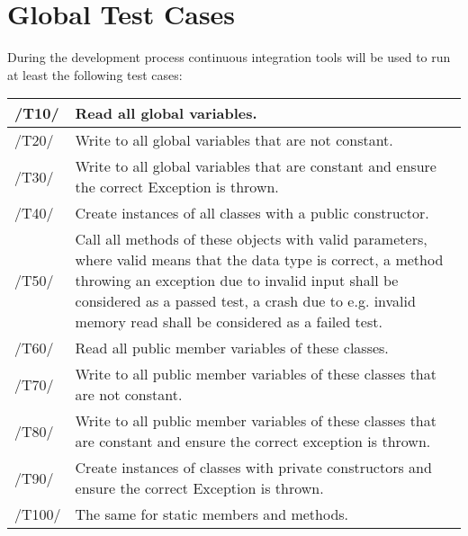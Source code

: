 \chapter{Global Test Cases}
During the development process continuous integration tools will be used to run at least the following test cases: \\

\begin{longtable}{|p{1cm} | p{15cm}|}
  \hline
  /T10/ & Read all global variables.\\
  \hline
  /T20/ & Write to all global variables that are not constant.\\
  \hline
  /T30/ & Write to all global variables that are constant and ensure the correct Exception is thrown.\\
  \hline
  /T40/ & Create instances of all classes with a public constructor.\\
  \hline
  /T50/ & Call all methods of these objects with valid parameters, where valid means that the data type is correct, a method throwing an exception due to invalid input shall be considered as a passed test, a crash due to e.g. invalid memory read shall be considered as a failed test.\\
  \hline
  /T60/ & Read all public member variables of these classes.\\
  \hline
  /T70/ & Write to all public member variables of these classes that are not constant.\\
  \hline
  /T80/ & Write to all public member variables of these classes that are constant and ensure the correct exception is thrown.\\
  \hline
  /T90/ & Create instances of classes with private constructors and ensure the correct Exception is thrown.\\
  \hline
  /T100/ &  The same for static members and methods.\\
   \hline
\end{longtable}
